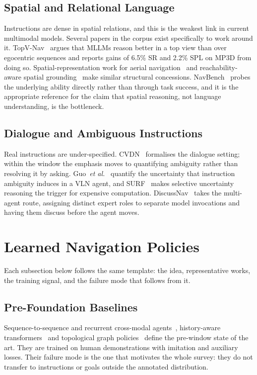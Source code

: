 \documentclass[journal]{IEEEtran}
\begin{document}
\subsection{Spatial and Relational Language}
Instructions are dense in spatial relations, and this is the weakest link in
current multimodal models. Several papers in the corpus exist specifically
to work around it. TopV-Nav~\cite{zhong2026topv} argues that MLLMs reason
better in a top view than over egocentric sequences and reports gains of
6.5\% SR and 2.2\% SPL on MP3D from doing so.
Spatial-representation work for aerial
navigation~\cite{gao2026exploring} and reachability-aware spatial
grounding~\cite{zhang2026what} make similar structural concessions.
NavBench~\cite{qiao2025navbench} probes the underlying ability directly
rather than through task success, and it is the appropriate reference for
the claim that spatial reasoning, not language understanding, is the
bottleneck.

\subsection{Dialogue and Ambiguous Instructions}
Real instructions are under-specified. CVDN~\cite{thomason2019vision}
formalises the dialogue setting; within the window the emphasis moves to
quantifying ambiguity rather than resolving it by asking.
Guo~\emph{et al.}~\cite{guo2026quantifying} quantify the uncertainty that
instruction ambiguity induces in a VLN agent, and
SURF~\cite{shinnick2026surf} makes selective uncertainty reasoning the
trigger for expensive computation. DiscussNav~\cite{long2024discuss} takes
the multi-agent route, assigning distinct expert roles to separate model
invocations and having them discuss before the agent moves.

\section{Learned Navigation Policies}\label{sec:policies}
Each subsection below follows the same template: the idea, representative
works, the training signal, and the failure mode that follows from it.

\subsection{Pre-Foundation Baselines}
Sequence-to-sequence and recurrent cross-modal
agents~\cite{hong2021recurrent}, history-aware
transformers~\cite{chen2021history} and topological graph
policies~\cite{chen2022think} define the pre-window state of the art.
They are trained on human demonstrations with imitation and auxiliary
losses. Their failure mode is the one that motivates the whole survey: they
do not transfer to instructions or goals outside the annotated
distribution.
\end{document}
